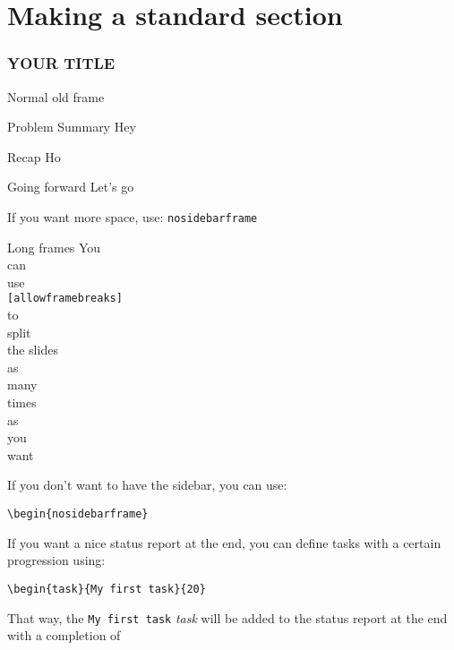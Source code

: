 

\section{Making a standard section}

\begin{frame}\frametitle{YOUR TITLE}
Normal old frame		
\end{frame}

\begin{frame}	
	\begin{block}{Problem Summary}
	Hey
	\end{block}
	
	
	\begin{exampleblock}{Recap}
	Ho
	\end{exampleblock}
	
	\begin{alertblock}{Going forward}
	Let's go
	\end{alertblock}

\end{frame}


\begin{nosidebarframe}
\centering
 If you want more space, use: \texttt{nosidebarframe}
\end{nosidebarframe}


\begin{frame}[allowframebreaks]{Long frames}
    You\\ can\\ use\\ \texttt{[allowframebreaks]}\\
    \framebreak
    to\\ split\\ the slides\\
    \framebreak
    as\\ many\\ times\\ as\\ you\\ want\\
\end{frame}


\begin{frame}[containsverbatim]

If you don't want to have the sidebar, you can use:

\verb|\begin{nosidebarframe}|

If you want a nice status report at the end, you can define tasks with a certain progression using:

\verb|\begin{task}{My first task}{20}|

That way, the \texttt{My first task} \textit{task} will be added to the status report at the end with a completion of 

\end{frame}



